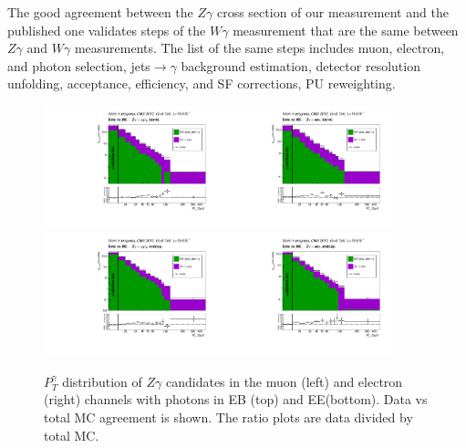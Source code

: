 The good agreement between the $Z\gamma$ cross section of our measurement and the published one validates steps of the $W\gamma$ measurement that are the same between $Z\gamma$ and $W\gamma$ measurements. The list of the same steps includes muon, electron, and photon selection, jets$\rightarrow\gamma$ background estimation, detector resolution unfolding, acceptance, efficiency, and SF corrections, PU reweighting.

\begin{figure}[htb]
  \begin{center}
   \includegraphics[width=0.45\textwidth]{../figs/figs_v11/MUON_ZGamma/PrepareYields/c_TotalDATAvsMC_Barrel__phoEt.pdf}\includegraphics[width=0.45\textwidth]{../figs/figs_v11/ELECTRON_ZGamma/PrepareYields/c_TotalDATAvsMC_Barrel__phoEt.pdf}
   \includegraphics[width=0.45\textwidth]{../figs/figs_v11/MUON_ZGamma/PrepareYields/c_TotalDATAvsMC_Endcap__phoEt.pdf}\includegraphics[width=0.45\textwidth]{../figs/figs_v11/ELECTRON_ZGamma/PrepareYields/c_TotalDATAvsMC_Endcap__phoEt.pdf}
  \caption{$P_T^{\gamma}$ distribution of $Z\gamma$ candidates in the muon (left) and electron (right) channels with photons in EB (top) and EE(bottom). Data vs total MC agreement is shown. The ratio plots are data divided by total MC.}
  \label{fig:DATAvsMC_Zg}
  \end{center}
\end{figure}

